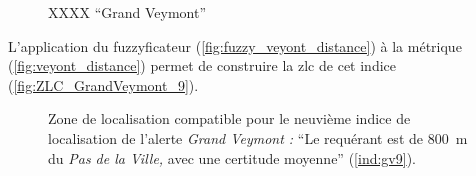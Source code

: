 
\begin{figure}
  \centering
  
  \caption{XXXX \enquote{Grand Veymont}}
  \label{fig:fuzzy_veyont_distance}
\end{figure}

L’application du fuzzyficateur (\autoref{fig:fuzzy_veyont_distance}) à
la métrique (\autoref{fig:veyont_distance}) permet de construire la
\ac{zlc} de cet indice (\autoref{fig:ZLC_GrandVeymont_9}).



\begin{figure}
  \centering
  
  \caption{Zone de localisation compatible pour le neuvième indice de
    localisation de l'alerte \emph{Grand Veymont :} \enquote{Le
      requérant est \protect{} de
      \SI{800}{\meter} du \emph{Pas de la Ville,} avec une certitude
      moyenne} (\ref{ind:gv9}).}
  \label{fig:ZLC_GrandVeymont_9}
\end{figure}



